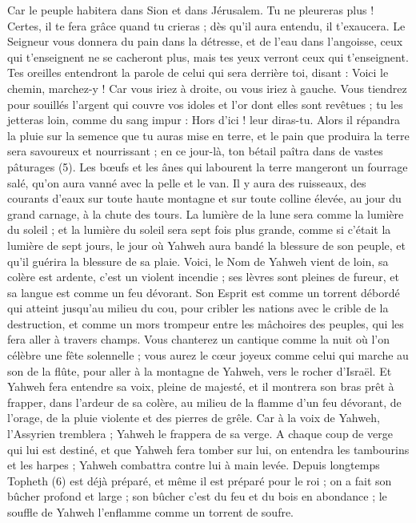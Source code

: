 \begin{multicols}{2}
Car le peuple habitera dans Sion et dans Jérusalem. Tu ne pleureras plus ! Certes, il te fera grâce quand tu crieras ; dès qu’il aura entendu, il t'exaucera.
Le Seigneur vous donnera du pain dans la détresse, et de l'eau dans l’angoisse, ceux qui t’enseignent ne se cacheront plus, mais tes yeux verront ceux qui t’enseignent.
Tes oreilles entendront la parole de celui qui sera derrière toi, disant : Voici le chemin, marchez-y ! Car vous iriez à droite, ou vous iriez à gauche.
Vous tiendrez pour souillés l’argent qui couvre vos idoles et l’or dont elles sont revêtues ; tu les jetteras loin, comme du sang impur : Hors d’ici ! leur diras-tu.
Alors il répandra la pluie sur la semence que tu auras mise en terre, et le pain que produira la terre sera savoureux et nourrissant ; en ce jour-là, ton bétail paîtra dans de vastes pâturages (5).
Les bœufs et les ânes qui labourent la terre mangeront un fourrage salé, qu’on aura vanné avec la pelle et le van.
Il y aura des ruisseaux, des courants d’eaux sur toute haute montagne et sur toute colline élevée, au jour du grand carnage, à la chute des tours.
La lumière de la lune sera comme la lumière du soleil ; et la lumière du soleil sera sept fois plus grande, comme si c'était la lumière de sept jours, le jour où Yahweh aura bandé la blessure de son peuple, et qu'il guérira la blessure de sa plaie.
Voici, le Nom de Yahweh vient de loin, sa colère est ardente, c’est un violent incendie ; ses lèvres sont pleines de fureur, et sa langue est comme un feu dévorant.
Son Esprit est comme un torrent débordé qui atteint jusqu’au milieu du cou, pour cribler les nations avec le crible de la destruction, et comme un mors trompeur entre les mâchoires des peuples, qui les fera aller à travers champs.
Vous chanterez un cantique comme la nuit où l’on célèbre une fête solennelle ; vous aurez le cœur joyeux comme celui qui marche au son de la flûte, pour aller à la montagne de Yahweh, vers le rocher d'Israël.
Et Yahweh fera entendre sa voix, pleine de majesté, et il montrera son bras prêt à frapper, dans l’ardeur de sa colère, au milieu de la flamme d’un feu dévorant, de l’orage, de la pluie violente et des pierres de grêle.
Car à la voix de Yahweh, l'Assyrien tremblera ; Yahweh le frappera de sa verge.
A chaque coup de verge qui lui est destiné, et que Yahweh fera tomber sur lui, on entendra les tambourins et les harpes ; Yahweh combattra contre lui à main levée.
Depuis longtemps Topheth (6) est déjà préparé, et même il est préparé pour le roi ; on a fait son bûcher profond et large ; son bûcher c'est du feu et du bois en abondance ; le souffle de Yahweh l’enflamme comme un torrent de soufre.

\end{multicols}
